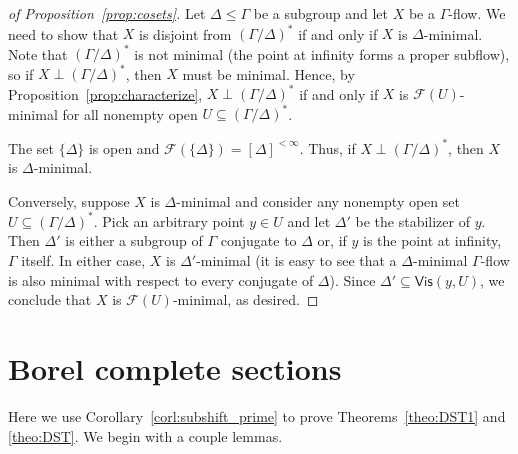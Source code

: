 \documentclass[11pt,reqno,psamsfonts]{amsart}
\theoremstyle{bfnote}
\theoremstyle{definition}
\theoremstyle{remark}
\newcommand{\0}{\varnothing}
\newcommand{\set}[1]{\{#1\}}
\renewcommand{\leq}{\leqslant}
\newcommand{\red}[1]{{\color{red}#1}}
\newcommand{\todo}[1]{\red{\textbf{\upshape{[#1]}}}}
\newcommand{\emphd}[1]{{\fontseries{b}\selectfont\textsf{#1}}}
\newcommand{\G}{\Gamma}
\newcommand{\Free}{\mathsf{Free}}
\newcommand{\fs}[2]{{[{#1}]^{#2}}}
\newcommand{\finset}[1]{\fs{{#1}}{{<\infty}}}
\newcommand{\N}{\mathbb{N}}
\newcommand{\Vis}{\mathsf{Vis}}
\numberwithin{equation}{section}
\newenvironment{scproof}[1][]{\begin{proof}[\textsc{\upshape{Proof}}#1]}{\end{proof}}
\begin{document}
    \begin{scproof}[ of Proposition~\ref{prop:cosets}]
        Let $\Delta \leq \G$ be a subgroup and let $X$ be a $\G$-flow. We need to show that $X$ is disjoint from $(\G/\Delta)^*$ if and only if $X$ is $\Delta$-minimal. Note that $(\G/\Delta)^*$ is not minimal (the point at infinity forms a proper subflow), so if $X \perp (\G/\Delta)^*$, then $X$ must be minimal. Hence, by Proposition~\ref{prop:characterize}, $X \perp (\G/\Delta)^*$ if and only if $X$ is $\mathcal{F}(U)$-minimal for all nonempty open $U \subseteq (\G/\Delta)^*$.

        The set $\set{\Delta}$ is open and $\mathcal{F}(\set{\Delta}) = \finset{\Delta}$. Thus, if $X \perp (\G/\Delta)^*$, then $X$ is $\Delta$-minimal.

        Conversely, suppose $X$ is $\Delta$-minimal and consider any nonempty open set $U \subseteq (\G/\Delta)^*$. Pick an arbitrary point $y \in U$ and let $\Delta'$ be the stabilizer of $y$. Then $\Delta'$ is either a subgroup of $\G$ conjugate to $\Delta$ or, if $y$ is the point at infinity, $\G$ itself. In either case, $X$ is $\Delta'$-minimal (it is easy to see that a $\Delta$-minimal $\G$-flow is also minimal with respect to every conjugate of $\Delta$). Since $\Delta' \subseteq \Vis(y, U)$, we conclude that $X$ is $\mathcal{F}(U)$-minimal, as desired.
    \end{scproof}

    \section{Borel complete sections}\label{subsec:subshift_appl}

    
    
    Here we use Corollary~\ref{corl:subshift_prime} to prove Theorems~\ref{theo:DST1} and \ref{theo:DST}. We begin with a couple lemmas.
\end{document}
